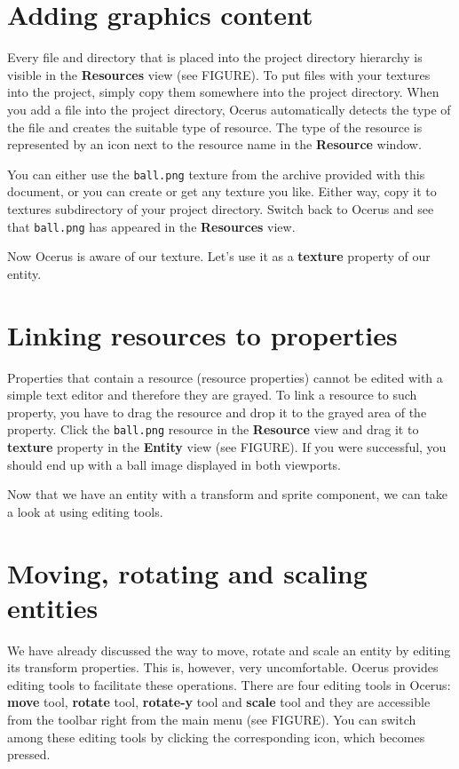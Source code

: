 \documentclass[a4paper,12pt]{article}
\begin{document}
\section{Adding graphics content}
Every file and directory that is placed into the project directory hierarchy is visible in the \textbf{Resources} view (see FIGURE). To put files with your textures into the project, simply copy them somewhere into the project directory. When you add a file into the project directory, Ocerus automatically detects the type of the file and creates the suitable type of resource. The type of the resource is represented by an icon next to the resource name in the \textbf{Resource} window.

You can either use the \texttt{ball.png} texture from the archive provided with this document, or you can create or get any texture you like. Either way, copy it to textures subdirectory of your project directory. Switch back to Ocerus and see that \texttt{ball.png} has appeared in the \textbf{Resources} view.

Now Ocerus is aware of our texture. Let's use it as a \textbf{texture} property of our entity.

\section{Linking resources to properties}
Properties that contain a resource (resource properties) cannot be edited with a simple text editor and therefore they are grayed. To link a resource to such property, you have to drag the resource and drop it to the grayed area of the property. Click the \texttt{ball.png} resource in the \textbf{Resource} view and drag it to \textbf{texture} property in the \textbf{Entity} view (see FIGURE). If you were successful, you should end up with a ball image displayed in both viewports.

Now that we have an entity with a transform and sprite component, we can take a look at using editing tools.

\section{Moving, rotating and scaling entities}
We have already discussed the way to move, rotate and scale an entity by editing its transform properties. This is, however, very uncomfortable. Ocerus provides editing tools to facilitate these operations. There are four editing tools in Ocerus: \textbf{move} tool, \textbf{rotate} tool, \textbf{rotate-y} tool and \textbf{scale} tool and they are accessible from the toolbar right from the main menu (see FIGURE). You can switch among these editing tools by clicking the corresponding icon, which becomes pressed.
\end{document}
